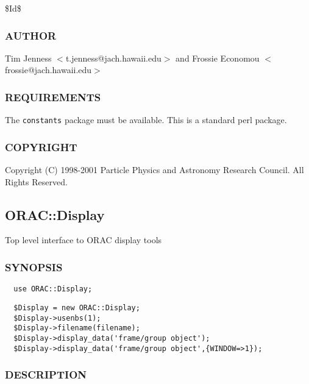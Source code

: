 \$Id\$

\subsubsection*{AUTHOR\label{ORAC::Constants_AUTHOR}}


Tim Jenness $<$t.jenness@jach.hawaii.edu$>$ and
Frossie Economou $<$frossie@jach.hawaii.edu$>$

\subsubsection*{REQUIREMENTS\label{ORAC::Constants_REQUIREMENTS}}


The \texttt{constants} package must be available. This is a standard
perl package.

\subsubsection*{COPYRIGHT\label{ORAC::Constants_COPYRIGHT}}


Copyright (C) 1998-2001 Particle Physics and Astronomy Research
Council. All Rights Reserved.

\subsection{ORAC::Display\label{ORAC::Display}}


Top level interface to ORAC display tools

\subsubsection*{SYNOPSIS\label{ORAC::Display_SYNOPSIS}}
\begin{verbatim}
  use ORAC::Display;
\end{verbatim}
\begin{verbatim}
  $Display = new ORAC::Display;
  $Display->usenbs(1);
  $Display->filename(filename);
  $Display->display_data('frame/group object');
  $Display->display_data('frame/group object',{WINDOW=>1});
\end{verbatim}
\subsubsection*{DESCRIPTION\label{ORAC::Display_DESCRIPTION}}


